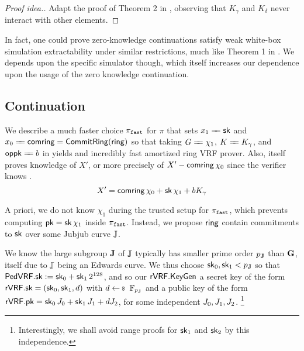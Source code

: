 \begin{proof}[Proof idea.]
Adapt the proof of Theorem 2 in \cite[\S3, pp. 9]{RandomizationGroth16},
observing that $K_\gamma$ and $K_\delta$ never interact with other elements. 
\end{proof}


In fact, one could prove zero-knowledge continuations satisfy
weak white-box simulation extractability under similar restrictions,
much like Theorem 1 in \cite[\S3, pp. 8 \& 11]{RandomizationGroth16}.
We depends upon the specific simulator though, which itself increases
our dependence upon the usage of the zero knowledge continuation.


\subsection{Continuation}
\label{subsec:rvrf_faster}


\def\longeq{=\mathrel{\mkern-7mu}=}%
We describe a much faster choice $\pi_{\mathtt{fast}}$ for $\pi$
that sets $x_1 \longeq \sk$ and $x_0 \longeq \comring = \CommitRing(\ring)$ so that
taking $\genG \longeq \chi_1$, $\genB \longeq \genB_\gamma$, and $\openpk \longeq b$ in \PedVRF
yields and incredibly fast amortized ring VRF prover.
Also, \PedVRF itself proves knowledge of $X'$,
 or more precisely of $X' - \mathsf{comring}\, \chi_0$ since the verifier knows \comring.
$$ X' = \mathsf{comring}\, \chi_0 + \mathsf{sk}\, \chi_1 + b K_\gamma $$


A priori, we do not know $\chi_1$ during the trusted setup for $\pi_{\mathtt{fast}}$,
which prevents computing $\mathsf{pk} = \mathsf{sk}\, \chi_1$ inside $\pi_{\mathtt{fast}}$.
Instead, we propose $\mathsf{ring}$ contain commitments to $\mathsf{sk}$ over
some Jubjub curve ${\mathbb{J}}$.  

We know the large subgroup ${\mathbf{J}}$ of ${\mathbb{J}}$ typically has smaller prime
order $p_{\mathbf{J}}$ than ${\mathbf{G}}$, itself due to ${\mathbb{J}}$ being an Edwards curve. 
We thus choose $\mathsf{sk}_0,\mathsf{sk}_1 < p_{\mathbf{J}}$ so that
 ${\mathsf{PedVRF}}.\mathsf{sk} := \mathsf{sk}_0 + \mathsf{sk}_1 \, 2^{128}$, and so
our ${\mathsf{rVRF}}.{\mathsf{KeyGen}}$ 
a secret key of the form ${\mathsf{rVRF}}.\mathsf{sk} = (\mathsf{sk}_0,\mathsf{sk}_1,d)$
 with $d \leftsample \F_{p_\grJ}$ and
a public key of the form
 ${\mathsf{rVRF}}.\mathsf{pk} = \mathsf{sk}_0\, J_0 + \mathsf{sk}_1\, J_1 + d J_2$,
for some independent $J_0,J_1,J_2$. %
\footnote{Interestingly, we shall avoid range proofs for $\mathsf{sk}_1$ and $\mathsf{sk}_2$ by this independence.}

